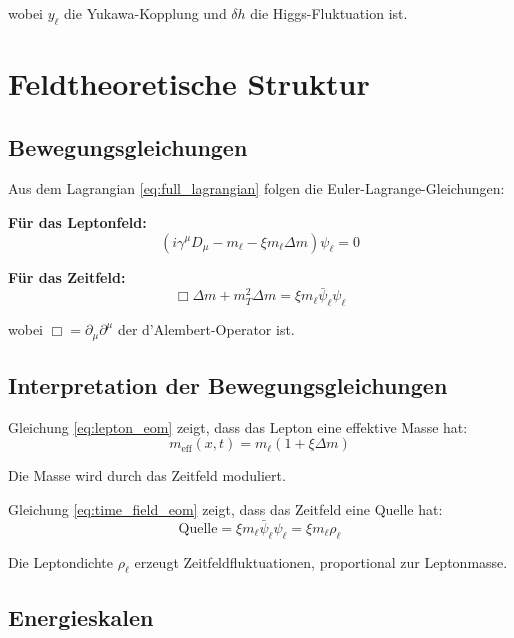 	wobei $y_\ell$ die Yukawa-Kopplung und $\delta h$ die Higgs-Fluktuation ist.
	
	\section{Feldtheoretische Struktur}
	
	\subsection{Bewegungsgleichungen}
	
	Aus dem Lagrangian \eqref{eq:full_lagrangian} folgen die Euler-Lagrange-Gleichungen:
	
	\textbf{Für das Leptonfeld:}
	\begin{equation}
		(i\gamma^\mu D_\mu - m_\ell - \xi m_\ell \Delta m)\psi_\ell = 0
		\label{eq:lepton_eom}
	\end{equation}
	
	\textbf{Für das Zeitfeld:}
	\begin{equation}
		\Box \Delta m + m_T^2 \Delta m = \xi m_\ell \bar{\psi}_\ell \psi_\ell
		\label{eq:time_field_eom}
	\end{equation}
	
	wobei $\Box = \partial_\mu \partial^\mu$ der d'Alembert-Operator ist.
	
	\subsection{Interpretation der Bewegungsgleichungen}
	
	Gleichung \eqref{eq:lepton_eom} zeigt, dass das Lepton eine effektive Masse hat:
	\begin{equation}
		m_{\text{eff}}(x,t) = m_\ell (1 + \xi \Delta m)
		\label{eq:effective_mass}
	\end{equation}
	
	Die Masse wird durch das Zeitfeld moduliert.
	
	Gleichung \eqref{eq:time_field_eom} zeigt, dass das Zeitfeld eine Quelle hat:
	\begin{equation}
		\text{Quelle} = \xi m_\ell \bar{\psi}_\ell \psi_\ell = \xi m_\ell \rho_\ell
		\label{eq:source_term}
	\end{equation}
	
	Die Leptondichte $\rho_\ell$ erzeugt Zeitfeldfluktuationen, proportional zur Leptonmasse.
	
	\subsection{Energieskalen}
	
